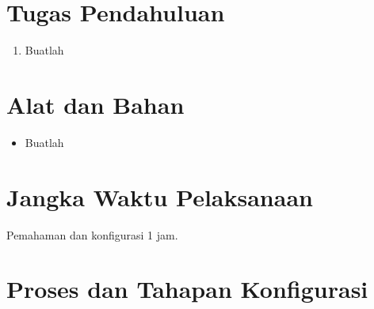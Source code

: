 \section{Tugas Pendahuluan}
\begin{enumerate}
\item Buatlah
\end{enumerate}

\section{Alat dan Bahan}
\begin{itemize}[label=$\bullet$, itemsep=-1pt, leftmargin=*]
	\item Buatlah
\end{itemize}

\section{Jangka Waktu Pelaksanaan}
Pemahaman dan konfigurasi 1 jam.


\section{Proses dan Tahapan Konfigurasi}
